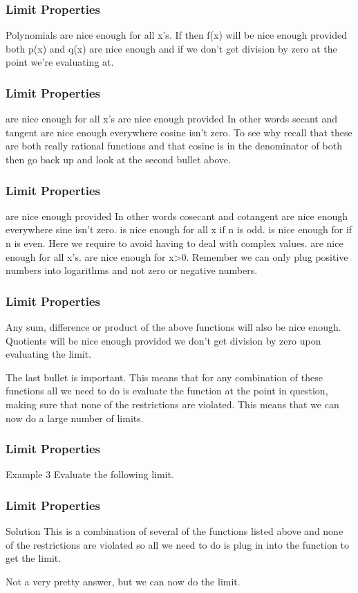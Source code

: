 \documentclass{beamer}
\begin{document}
\begin{frame}[fragile]
	\frametitle{Limit Properties}
	\Large
Polynomials are nice enough for all x’s.
If  then f(x) will be nice enough provided both p(x) and q(x) are nice enough and if we don’t get division by zero at the point we’re evaluating at.
\end{frame}
\begin{frame}[fragile]
	\frametitle{Limit Properties}
	\Large
 are nice enough for all x’s
 are nice enough provided   In other words secant and tangent are nice enough everywhere cosine isn’t zero.  To see why recall that these are both really rational functions and that cosine is in the denominator of both then go back up and look at the second bullet above.
\end{frame}
\begin{frame}[fragile]
	\frametitle{Limit Properties}
	\Large
 are nice enough  provided   In other words cosecant and cotangent are nice enough everywhere sine isn’t zero.
 is nice enough for all x if n is odd.
 is nice enough for   if n is even.  Here we require  to avoid having to deal with complex values.
 are nice enough for all x’s.
 are nice enough for x>0.  Remember we can only plug positive numbers into logarithms and not zero or negative numbers.
\end{frame}
\begin{frame}[fragile]
\frametitle{Limit Properties}
\Large
Any sum, difference or product of the above functions will also be nice enough.  Quotients will be nice enough provided we don’t get division by zero upon evaluating the limit.
 
The last bullet is important.  This means that for any combination of these functions all we need to do is evaluate the function at the point in question, making sure that none of the restrictions are violated.  This means that we can now do a large number of limits.
 
\end{frame}
\begin{frame}[fragile]
	\frametitle{Limit Properties}
	\Large
	
Example 3  Evaluate the following limit.

\end{frame}
\begin{frame}[fragile]
	\frametitle{Limit Properties}
	\Large
	
Solution
This is a combination of several of the functions listed above and none of the restrictions are violated so all we need to do is plug in  into the function to get the limit.

 
Not a very pretty answer, but we can now do the limit.
\end{frame}
\end{document}
